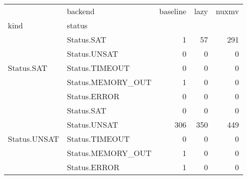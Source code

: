 \begin{tabular}{llrrr}
\toprule
 & backend & baseline & lazy & nuxmv \\
kind & status &  &  &  \\
\midrule
\multirow[c]{5}{*}{Status.SAT} & Status.SAT & 1 & 57 & 291 \\
 & Status.UNSAT & 0 & 0 & 0 \\
 & Status.TIMEOUT & 0 & 0 & 0 \\
 & Status.MEMORY_OUT & 1 & 0 & 0 \\
 & Status.ERROR & 0 & 0 & 0 \\
\multirow[c]{5}{*}{Status.UNSAT} & Status.SAT & 0 & 0 & 0 \\
 & Status.UNSAT & 306 & 350 & 449 \\
 & Status.TIMEOUT & 0 & 0 & 0 \\
 & Status.MEMORY_OUT & 1 & 0 & 0 \\
 & Status.ERROR & 1 & 0 & 0 \\
\bottomrule
\end{tabular}
